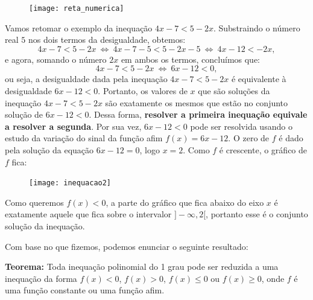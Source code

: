 \begin{figure}[H]
\centering
\noindent\texttt{[image: reta\_numerica]}
\end{figure}

Vamos retomar o exemplo da inequação $4x-7 < 5-2x$. Substraindo o número real $5$ nos dois termos da desigualdade, obtemos:
$$
4x-7 < 5 - 2x \ \iff \ 4x - 7 - 5 < 5 - 2x - 5 \ \iff \ 4x - 12 < - 2x,
$$
e agora, somando o número $2x$ em ambos os termos, concluímos que:
$$
4x - 7 < 5 - 2x \ \iff \ 6x -12 < 0, 
$$
ou seja, a desigualdade dada pela inequação $4x - 7 < 5 - 2x$ é equivalente à desigualdade $6x - 12 < 0$. Portanto, os valores de $x$ que são soluções da inequação $4x - 7 < 5 - 2x$ são exatamente os mesmos que estão no conjunto solução de $6x - 12 <0$. Dessa forma, \textbf{resolver a primeira inequação equivale a resolver a segunda}. Por sua vez, $6x - 12 < 0$ pode ser resolvida usando o estudo da variação do sinal da função afim $f(x) = 6x - 12$. O zero de $f$ é dado pela solução da equação $6x - 12 = 0$, logo $x = 2$. Como $f$ é crescente, o gráfico de $f$ fica:

   \begin{figure}[H]
\centering
\noindent\texttt{[image: inequacao2]}
\end{figure}

Como queremos $f(x) < 0$, a parte do gráfico que fica abaixo do eixo $x$ é exatamente aquele que fica sobre o intervalor $]-\infty, 2[$, portanto esse é o conjunto solução da inequação.

Com base no que fizemos, podemos enunciar o seguinte resultado:

\begin{observation}{}
\textbf{Teorema:} Toda inequação polinomial do 1 grau pode ser reduzida a uma inequação da forma $f(x) <0$, $f(x) > 0$, $f(x) \leq 0$ ou $f(x) \geq 0$, onde $f$ é uma função constante ou uma função afim.

\end{observation}

